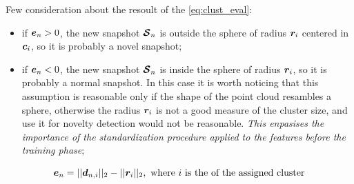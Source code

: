 Few consideration about the resoult of the \autoref{eq:clust_eval}:
\begin{itemize}
  \item if $\bm{e}_{n} > 0$, the new snapshot $\bm{\mathcal{S}}_n$ is outside the sphere of radius $\bm{r}_i$ centered in $\bm{c}_i$, so it is probably a novel snapshot;
  \item if $\bm{e}_{n} < 0$, the new snapshot $\bm{\mathcal{S}}_n$ is inside the sphere of radius $\bm{r}_i$, so it is probably a normal snapshot. In this case it is worth noticing that this assumption is reasonable only if the shape of the point cloud resambles a sphere, otherwise the radius $\bm{r}_i$ is not a good measure of the cluster size, and use it for novelty detection would not be reasonable. \emph{This enpasises the importance of the standardization procedure applied to the features before the training phase};
\end{itemize}

\begin{equation}
  \label{eq:clust_eval}
  \bm{e}_{n} = ||\bm{d}_{n,i}||_2 - ||\bm{r}_{i}||_2, \text{ where $i$ is the of the assigned cluster}
\end{equation}


